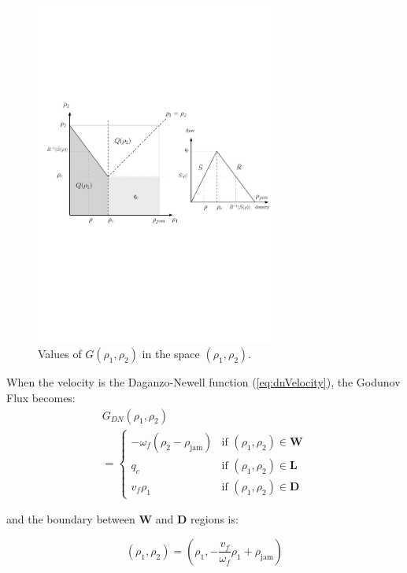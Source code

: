 \begin{figure}[ht]
  \centering
    \includegraphics[width=8cm]{figures/godunovDiagram.pdf}
    \caption{Values of $G(\rho_{1},\rho_{2})$ in the space $(\rho_{1},\rho_{2})$.}
    \label{fig:godunovDiagram}
\end{figure}

\noindent When the velocity is the Daganzo-Newell function (\ref{eq:dnVelocity}), the Godunov Flux becomes:
\begin{equation} \label{eq:rhoGodunovFlux3}
\begin{array}{l}
G_{DN}(\rho_{1},\rho_{2})\\
= \begin{cases}
-\omega_{f} \left( \rho_{2} - \rho_{\text{jam}} \right) & \text{if } (\rho_{1},\rho_{2}) \in \textbf{W}\\
q_{c} & \text{if } (\rho_{1},\rho_{2}) \in \textbf{L}\\
v_{f} \rho_{1} & \text{if } (\rho_{1},\rho_{2}) \in \textbf{D}
\end{cases}
\end{array}
\end{equation}

\noindent and the boundary between \textbf{W} and \textbf{D} regions is:

\begin{equation} \label{eq:boundary}
(\rho_{1},\rho_{2})=(\rho_{1},-\frac{v_{f}}{\omega_{f}}\rho_{1}+\rho_{\text{jam}})
\end{equation}

